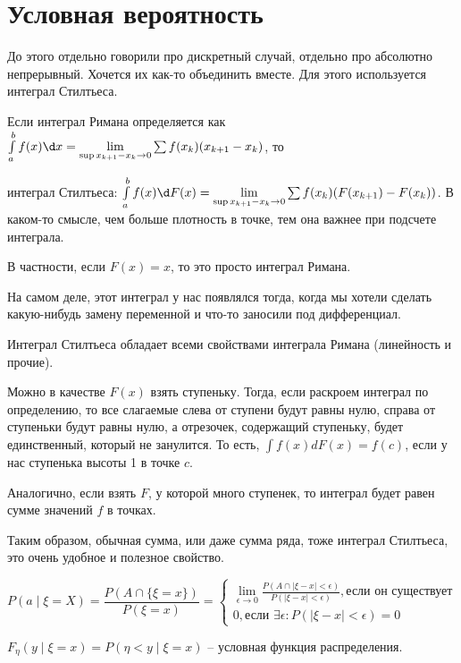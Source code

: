 \section{Условная вероятность}
До этого отдельно говорили про дискретный случай, отдельно про абсолютно непрерывный. Хочется их как-то объединить вместе.
Для этого используется интеграл Стилтьеса.

Если интеграл Римана определяется как $\int\limits_a^b f(x)\d x = \lim\limits_{\sup x_{k+1}-x_k \to 0} \sum f(x_k)(x_{k+1} - x_k)$, то

интеграл Стилтьеса: $\int\limits_a^b f(x)\d F(x) = \lim \limits_{\sup x_{k+1}-x_k \to 0} \sum f(x_k) (F(x_{k+1}) - F(x_k))$. В каком-то смысле, чем больше плотность в точке, тем она важнее при подсчете интеграла.

В частности, если $F(x) = x$, то это просто интеграл Римана.
\begin{Rem}
На самом деле, этот интеграл у нас появлялся тогда, когда мы хотели сделать какую-нибудь замену переменной и что-то заносили под дифференциал.
\end{Rem}

Интеграл Стилтьеса обладает всеми свойствами интеграла Римана (линейность и прочие).

Можно в качестве $F(x)$ взять ступеньку. 
Тогда, если раскроем интеграл по определению, то все слагаемые слева от ступени будут равны нулю, справа от ступеньки будут равны нулю, а отрезочек, содержащий ступеньку, будет единственный, который не занулится.
То есть, $\int f(x) dF(x) = f(c)$, если у нас ступенька высоты 1 в точке $c$.

Аналогично, если взять $F$, у которой много ступенек, то интеграл будет равен сумме значений $f$ в точках.

Таким образом, обычная сумма, или даже сумма ряда, тоже интеграл Стилтьеса, это очень удобное и полезное свойство.

\begin{Def}
$$P(a \mid \xi = X) = \frac{P(A \cap \{\xi = x\})}{P(\xi = x)} = \begin{cases} \lim\limits_{\epsilon \to 0}  \frac{P(A \cap |\xi - x| < \epsilon)}{P(|\xi - x| < \epsilon)}, \text{если он существует} \\
0, \text{если } \exists \epsilon \colon P(|\xi - x| < \epsilon) = 0 \end{cases}$$
\end{Def}

\begin{Def}
    $F_{\eta}(y \mid \xi = x) = P(\eta < y \mid \xi = x)$ -- условная функция распределения.    
\end{Def}

